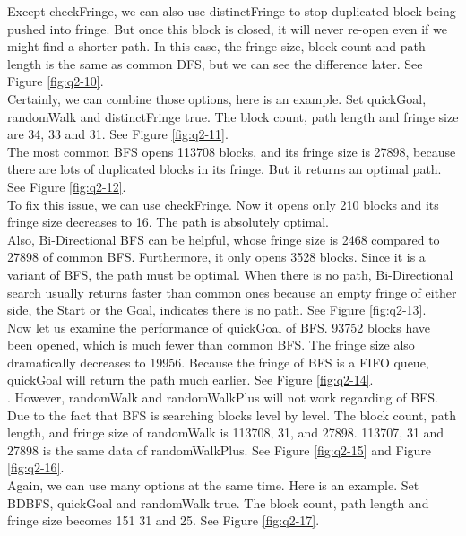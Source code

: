 \documentclass[letter]{article}
\begin{document}
\begin{questions}
	Except checkFringe, we can also use distinctFringe to stop duplicated block being pushed into fringe. But once this block is closed, it will never re-open even if we might find a shorter path. In this case, the fringe size, block count and path length is the same as common DFS, but we can see the difference later. See Figure \ref{fig:q2-10}.\\
	
	Certainly, we can combine those options, here is an example. Set quickGoal, randomWalk and distinctFringe true. The block count, path length and fringe size are 34, 33 and 31. See Figure \ref{fig:q2-11}.\\
	
	The most common BFS opens 113708 blocks, and its fringe size is 27898, because there are lots of duplicated blocks in its fringe. But it returns an optimal path. See Figure \ref{fig:q2-12}.\\
	
	To fix this issue, we can use checkFringe. Now it opens only 210 blocks and its fringe size decreases to 16. The path is absolutely optimal. \\
	
	Also, Bi-Directional BFS can be helpful, whose fringe size is 2468 compared to 27898 of common BFS. Furthermore, it only opens 3528 blocks. Since it is a variant of BFS, the path must be optimal. When there is no path, Bi-Directional search usually returns faster than common ones because an empty fringe of either side, the Start or the Goal, indicates there is no path. See Figure \ref{fig:q2-13}. \\
	
	Now let us examine the performance of quickGoal of BFS. 93752 blocks have been opened, which is much fewer than common BFS. The fringe size also dramatically decreases to 19956. Because the fringe of BFS is a FIFO queue, quickGoal will return the path much earlier. See Figure \ref{fig:q2-14}. \\
	. 
	However, randomWalk and randomWalkPlus will not work regarding of BFS. Due to the fact that BFS is searching blocks level by level. The block count, path length, and fringe size of randomWalk is 113708, 31, and 27898. 113707, 31 and 27898 is the same data of randomWalkPlus. See Figure \ref{fig:q2-15} and Figure \ref{fig:q2-16}. \\
	 
	Again, we can use many options at the same time. Here is an example. Set BDBFS, quickGoal and randomWalk true. The block count, path length and fringe size becomes 151 31 and 25. See Figure \ref{fig:q2-17}.\\
	

\end{questions}
\end{document}
